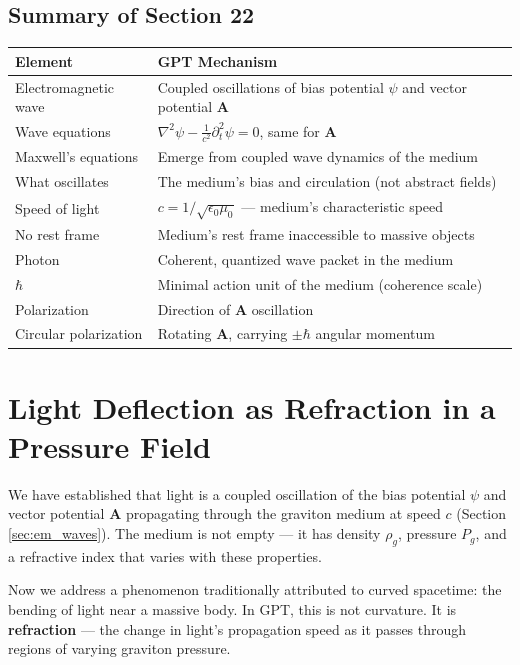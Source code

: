 \documentclass[12pt, a4paper]{article}
\begin{document}
\subsection{Summary of Section 22}
\label{subsec:summary_22}

\begin{center}
\begin{tabular}{|p{4cm}|p{10cm}|}
\hline
\textbf{Element} & \textbf{GPT Mechanism} \\
\hline
Electromagnetic wave & Coupled oscillations of bias potential \( \psi \) and vector potential \( \mathbf{A} \) \\
\hline
Wave equations & \( \nabla^2 \psi - \frac{1}{c^2} \partial_t^2 \psi = 0 \), same for \( \mathbf{A} \) \\
\hline
Maxwell's equations & Emerge from coupled wave dynamics of the medium \\
\hline
What oscillates & The medium's bias and circulation (not abstract fields) \\
\hline
Speed of light & \( c = 1/\sqrt{\epsilon_0 \mu_0} \) — medium's characteristic speed \\
\hline
No rest frame & Medium's rest frame inaccessible to massive objects \\
\hline
Photon & Coherent, quantized wave packet in the medium \\
\hline
\( \hbar \) & Minimal action unit of the medium (coherence scale) \\
\hline
Polarization & Direction of \( \mathbf{A} \) oscillation \\
\hline
Circular polarization & Rotating \( \mathbf{A} \), carrying \( \pm \hbar \) angular momentum \\
\hline
\end{tabular}
\end{center}
\section{Light Deflection as Refraction in a Pressure Field}
\label{sec:light_deflection_refraction}

We have established that light is a coupled oscillation of the bias potential \( \psi \) and vector potential \( \mathbf{A} \) propagating through the graviton medium at speed \( c \) (Section \ref{sec:em_waves}). The medium is not empty — it has density \( \rho_g \), pressure \( P_g \), and a refractive index that varies with these properties.

Now we address a phenomenon traditionally attributed to curved spacetime: the bending of light near a massive body. In GPT, this is not curvature. It is \textbf{refraction} — the change in light's propagation speed as it passes through regions of varying graviton pressure.
\end{document}
